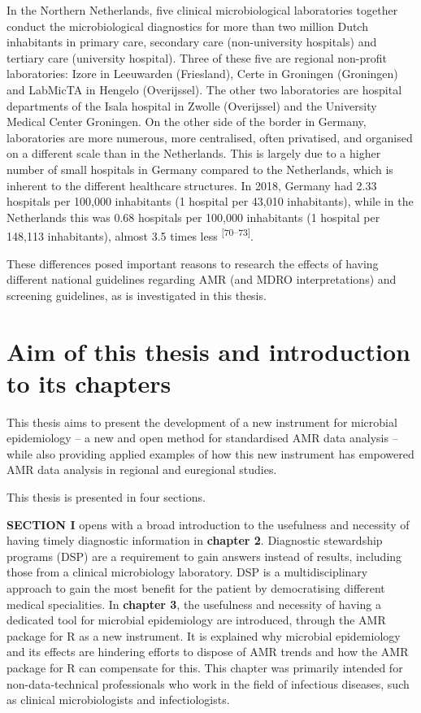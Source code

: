 \documentclass[
]{book}
\begin{document}
In the Northern Netherlands, five clinical microbiological laboratories together conduct the microbiological diagnostics for more than two million Dutch inhabitants in primary care, secondary care (non-university hospitals) and tertiary care (university hospital). Three of these five are regional non-profit laboratories: Izore in Leeuwarden (Friesland), Certe in Groningen (Groningen) and LabMicTA in Hengelo (Overijssel). The other two laboratories are hospital departments of the Isala hospital in Zwolle (Overijssel) and the University Medical Center Groningen. On the other side of the border in Germany, laboratories are more numerous, more centralised, often privatised, and organised on a different scale than in the Netherlands. This is largely due to a higher number of small hospitals in Germany compared to the Netherlands, which is inherent to the different healthcare structures. In 2018, Germany had 2.33 hospitals per 100,000 inhabitants (1 hospital per 43,010 inhabitants), while in the Netherlands this was 0.68 hospitals per 100,000 inhabitants (1 hospital per 148,113 inhabitants), almost 3.5 times less \textsuperscript{{[}70--73{]}}.

These differences posed important reasons to research the effects of having different national guidelines regarding AMR (and MDRO interpretations) and screening guidelines, as is investigated in this thesis.

\hypertarget{aim-of-this-thesis-and-introduction-to-its-chapters}{%
\section{Aim of this thesis and introduction to its chapters}\label{aim-of-this-thesis-and-introduction-to-its-chapters}}

This thesis aims to present the development of a new instrument for microbial epidemiology -- a new and open method for standardised AMR data analysis -- while also providing applied examples of how this new instrument has empowered AMR data analysis in regional and euregional studies.

This thesis is presented in four sections.

\textbf{SECTION I} opens with a broad introduction to the usefulness and necessity of having timely diagnostic information in \textbf{chapter 2}. Diagnostic stewardship programs (DSP) are a requirement to gain answers instead of results, including those from a clinical microbiology laboratory. DSP is a multidisciplinary approach to gain the most benefit for the patient by democratising different medical specialities. In \textbf{chapter 3}, the usefulness and necessity of having a dedicated tool for microbial epidemiology are introduced, through the AMR package for R as a new instrument. It is explained why microbial epidemiology and its effects are hindering efforts to dispose of AMR trends and how the AMR package for R can compensate for this. This chapter was primarily intended for non-data-technical professionals who work in the field of infectious diseases, such as clinical microbiologists and infectiologists.
\end{document}
